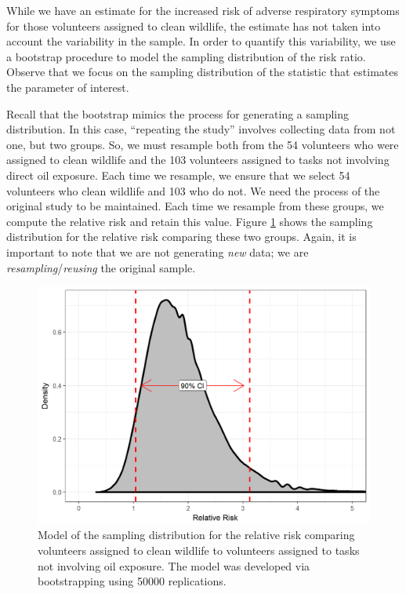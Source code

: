\documentclass[]{book}
\theoremstyle{plain}
\theoremstyle{mydefn}
\theoremstyle{myexmpl}
\theoremstyle{remark}
\begin{document}
While we have an estimate for the increased risk of adverse respiratory
symptoms for those volunteers assigned to clean wildlife, the estimate
has not taken into account the variability in the sample. In order to
quantify this variability, we use a bootstrap procedure to model the
sampling distribution of the risk ratio. Observe that we focus on the
sampling distribution of the statistic that estimates the parameter of
interest.

Recall that the bootstrap mimics the process for generating a sampling
distribution. In this case, ``repeating the study'' involves collecting
data from not one, but two groups. So, we must resample both from the 54
volunteers who were assigned to clean wildlife and the 103 volunteers
assigned to tasks not involving direct oil exposure. Each time we
resample, we ensure that we select 54 volunteers who clean wildlife and
103 who do not. We need the process of the original study to be
maintained. Each time we resample from these groups, we compute the
relative risk and retain this value. Figure
\ref{fig:recaplanguage-sampling-distribution} shows the sampling
distribution for the relative risk comparing these two groups. Again, it
is important to note that we are not generating \emph{new} data; we are
\emph{resampling}/\emph{reusing} the original sample.

\begin{figure}

{\centering \includegraphics[width=0.8\linewidth]{./Images/recaplanguage-sampling-distribution-1} 

}

\caption{Model of the sampling distribution for the relative risk comparing volunteers assigned to clean wildlife to volunteers assigned to tasks not involving oil exposure.  The model was developed via bootstrapping using 50000 replications.}\label{fig:recaplanguage-sampling-distribution}
\end{figure}
\end{document}
